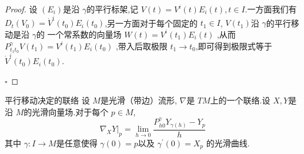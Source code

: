 \documentclass[../../几何与拓扑.tex]{subfiles}
\begin{document}
\begin{proof}
    设 \(  \left( E_{i} \right)   \)是沿 \(   \gamma   \)的平行标架,记 \(  V\left( t \right)= V^{i}\left( t \right)E_{i}\left( t \right),t\in I     \).一方面我们有 \(  D_{t}\left( V_0 \right)= \dot{V}^{i}\left( t_0 \right)E_{i}\left( t_0 \right)     \),另一方面对于每个固定的 \(  t_1\in I  \), \(  V\left( t_1 \right)   \)沿 \(   \gamma   \)的平行移动是沿 \(   \gamma   \)的 一个常系数的向量场 \(  W\left( t \right)= V^{i}\left( t_1 \right)E_{i}\left( t \right)     \)        ,从而 \(  P_{t_1t_0}^{ \gamma }V\left( t_1 \right)= V^{i}\left( t_1 \right)E_{i}\left( t_0 \right)     \) ,带入后取极限 \(  t_1\to t_0  \),即可得到极限式等于 \(  \dot{V}^{i}\left( t_0 \right)E_{i}\left( t_0 \right)    \).  

    \hfill $\square$
\end{proof}

\begin{corollary}{平行移动决定的联络}
    设 \(  M  \)是光滑（带边）流形, \(   \nabla   \)是 \(  TM  \)上的一个联络.设 \(  X,Y  \)是沿 \(  M  \)的光滑向量场.对于每个 \(  p \in M  \), \[
    \left.  \nabla _{X}Y \right|_{p} =  \lim_{h\to 0}\frac{P_{h0}^{ \gamma }Y_{ \gamma \left( h \right) }-Y_{p} }{h } 
    \]      其中 \(   \gamma :I\to M  \)是任意使得 \(   \gamma \left( 0 \right)= p   \)以及 \(   \gamma ^{\prime} \left( 0 \right)= X_{p}   \)   的光滑曲线.
\end{corollary}
\end{document}
